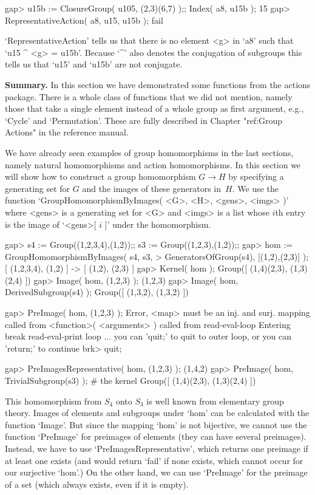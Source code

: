 \beginexample
gap> u15b := ClosureGroup( u105, (2,3)(6,7) );; Index( a8, u15b );
15
gap> RepresentativeAction( a8, u15, u15b );
fail
\endexample

`RepresentativeAction' tells us that  there is no  element <g> in `a8'
such that `u15 ^ <g> = u15b'. Because `^' also denotes the conjugation of
subgroups this tells us  that  `u15' and  `u15b' are not  conjugate.

{\bf  Summary.} In this section we  have demonstrated some functions from
the actions package. There  is a whole class of  functions that we did
not mention, namely  those that take a  single element instead of a whole
group as first argument, e.g., `Cycle' and `Permutation'. These are fully
described  in Chapter "ref:Group Actions"  in the  reference
manual.


We   have already  seen  examples of   group homomorphisms  in  the  last
sections,  namely natural homomorphisms  and  action homomorphisms. In
this section we will show how to construct a  group homomorphism $G\to H$
by specifying a generating set for $G$ and the images of these generators
in~$H$. We use the function `GroupHomomorphismByImages( <G>, <H>, <gens>,
<imgs> )' where <gens> is a  generating set for <G> and  <imgs> is a list
whose $i$th entry is the image of `<gens>[ $i$ ]' under the homomorphism.

\beginexample
gap> s4 := Group((1,2,3,4),(1,2));; s3 := Group((1,2,3),(1,2));;
gap> hom := GroupHomomorphismByImages( s4, s3,
>           GeneratorsOfGroup(s4), [(1,2),(2,3)] );
[ (1,2,3,4), (1,2) ] -> [ (1,2), (2,3) ]
gap> Kernel( hom );
Group([ (1,4)(2,3), (1,3)(2,4) ])
gap> Image( hom, (1,2,3) );
(1,2,3)
gap> Image( hom, DerivedSubgroup(s4) );
Group([ (1,3,2), (1,3,2) ])
\endexample

\beginexample
gap> PreImage( hom, (1,2,3) );
Error, <map> must be an inj. and surj. mapping called from
<function>( <arguments> ) called from read-eval-loop
Entering break read-eval-print loop ...
you can 'quit;' to quit to outer loop, or
you can 'return;' to continue
brk> quit;
\endexample

\beginexample
gap> PreImagesRepresentative( hom, (1,2,3) );
(1,4,2)
gap> PreImage( hom, TrivialSubgroup(s3) );  # the kernel
Group([ (1,4)(2,3), (1,3)(2,4) ])
\endexample

This homomorphism  from $S_4$ onto  $S_3$  is well known  from elementary
group theory.  Images   of elements and  subgroups  under   `hom' can  be
calculated with the function `Image'. But since the mapping `hom' is  not
bijective, we  cannot use   the   function `PreImage' for  preimages   of
elements  (they can have   several preimages). Instead,   we have  to use
`PreImagesRepresentative', which  returns  one  preimage if at  least one
exists (and would  return `fail' if none  exists, which  cannot occur for
our surjective `hom'.)  On the other hand, we  can use `PreImage' for the
preimage of a set (which always exists, even if it  is empty).

